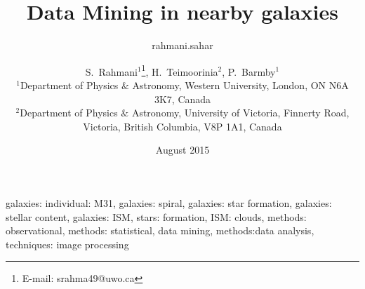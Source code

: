 \documentclass[useAMS,usenatbib]{mn2e}
\newcommand \um    {$\mu$m\ }
\newcommand \mice {$\mu$m}
\begin{document}

\title{Data Mining in nearby galaxies}
\author{rahmani.sahar }
\date{August 2015}
\author[S. Rahmani, et. al.]{S.~Rahmani$^{1}$\thanks{E-mail:
srahma49@uwo.ca}, H.~Teimoorinia$^{2}$, P.~Barmby$^{1}$\\
$^{1}$Department of Physics $\&$ Astronomy, Western University, London, ON N6A 3K7, Canada\\
$^{2}$Department of Physics $\&$ Astronomy, University of Victoria, Finnerty Road, Victoria, British Columbia, V8P 1A1, Canada}
\maketitle

\begin{abstract} 

\end{abstract}
\begin{keywords} 
galaxies: individual: M31, galaxies: spiral, galaxies: star formation, galaxies: stellar content, galaxies: ISM, stars: formation, ISM: clouds, methods: observational, methods: statistical, data mining, methods:data analysis, techniques: image processing 
\end{keywords}
\end{document}
